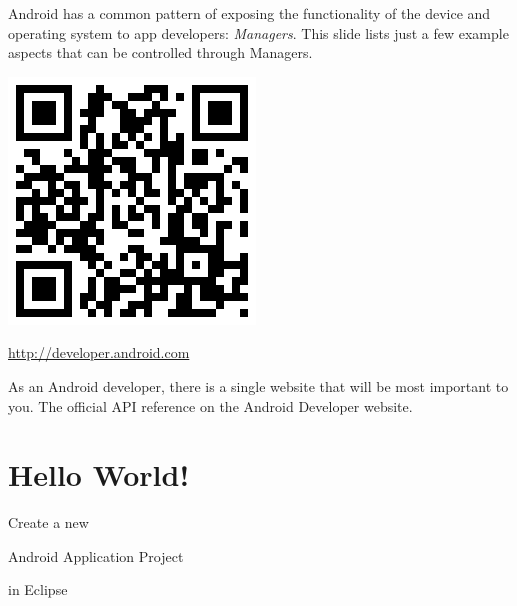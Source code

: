 \documentclass[a4paper,slides=slides,handouts=handouts]{mh-presentation}       %
\begin{document}
	\begin{summary}[5]
		Android has a common pattern of exposing the functionality of the device and
		operating system to app developers: \emph{Managers}. This slide lists just a
		few example aspects that can be controlled through Managers.
	\end{summary}
	
	\begin{slide}
		\includegraphics[scale=.5]{androiddevqr.png}
		
		\vspace{5mm}
		
		{\huge\url{http://developer.android.com}}
	\end{slide}
	
	\begin{summary}
		As an Android developer, there is a single website that will be most important
		to you. The official API reference on the Android Developer website.
	\end{summary}

\section{Hello World!}
	
	\begin{slide}
		{\Huge Create a new}
		
		\vspace{3mm}
		
		{\Huge Android Application Project}
		
		\vspace{3mm}
		
		{\Huge in Eclipse}
	\end{slide}

\end{document}
